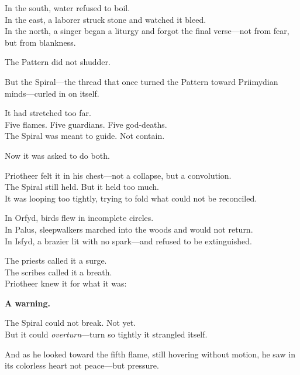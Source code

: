 \documentclass[12pt]{article}
\begin{document}
\vspace{0.5em}
In the south, water refused to boil.\\
In the east, a laborer struck stone and watched it bleed.\\
In the north, a singer began a liturgy and forgot the final verse---not from fear, but from blankness.

\vspace{0.5em}
The Pattern did not shudder.

\vspace{0.5em}
But the Spiral---the thread that once turned the Pattern toward Priimydian minds---curled in on itself.

\vspace{0.5em}
It had stretched too far.\\
Five flames. Five guardians. Five god-deaths.\\
The Spiral was meant to guide. Not contain.

\vspace{0.5em}
Now it was asked to do both.

\vspace{0.5em}
Priotheer felt it in his chest---not a collapse, but a convolution.\\
The Spiral still held. But it held too much.\\
It was looping too tightly, trying to fold what could not be reconciled.

\vspace{0.5em}
In Orfyd, birds flew in incomplete circles.\\
In Palus, sleepwalkers marched into the woods and would not return.\\
In Isfyd, a brazier lit with no spark---and refused to be extinguished.

\vspace{0.5em}
The priests called it a surge.\\
The scribes called it a breath.\\
Priotheer knew it for what it was:

\vspace{0.5em}
\textbf{A warning.}

\vspace{0.5em}
The Spiral could not break. Not yet.\\
But it could \textit{overturn}---turn so tightly it strangled itself.

\vspace{0.5em}
And as he looked toward the fifth flame, still hovering without motion, he saw in its colorless heart not peace---but pressure.
\end{document}
